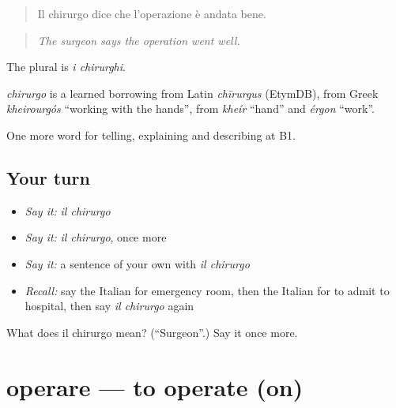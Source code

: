 \begin{quote}
Il chirurgo dice che l'operazione è andata bene.
\end{quote}

\begin{quote}
\emph{The surgeon says the operation went well.}
\end{quote}

The plural is \emph{i chirurghi}.

\begin{cousinweb}
\emph{chirurgo} is a learned borrowing from Latin \emph{chīrurgus} (EtymDB), from Greek \emph{kheirourgós} \textquotedblleft{}working with the hands\textquotedblright{}, from \emph{kheír} \textquotedblleft{}hand\textquotedblright{} and \emph{érgon} \textquotedblleft{}work\textquotedblright{}.
\end{cousinweb}

\begin{grammarlens}[title={What you've built}]
One more word for telling, explaining and describing at B1.
\end{grammarlens}

\subsection*{Your turn}
\begin{itemize}
\raggedright
  \item \emph{Say it:} \emph{il chirurgo}
  \item \emph{Say it:} \emph{il chirurgo}, once more
  \item \emph{Say it:} a sentence of your own with \emph{il chirurgo}
  \item \emph{Recall:} say the Italian for emergency room, then the Italian for to admit to hospital, then say \emph{il chirurgo} again
\end{itemize}

\begin{tcolorbox}[breakable,colback=teal!4,colframe=teal!35!black,title={Before you move on}]
What does il chirurgo mean? (\textquotedblleft{}Surgeon\textquotedblright{}.) Say it once more.
\end{tcolorbox}
\section[operare]{operare — to operate (on)}

\label{lesson:IT-C488-operare}



